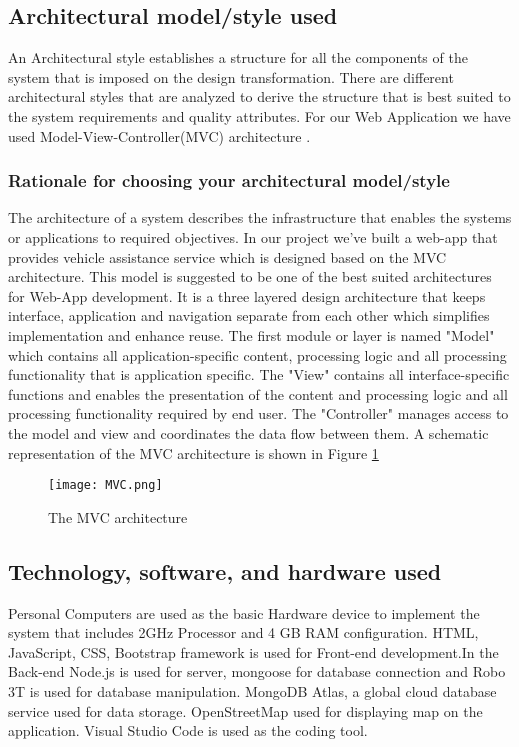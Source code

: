 \documentclass[11pt]{article} %
\begin{document}
	\subsection{Architectural model/style used}
	An Architectural style establishes a structure for all the components of the system that is imposed on the design transformation. There are different architectural styles that are analyzed to derive the structure that is best suited to the system requirements and quality attributes.
	For our Web Application we have used Model-View-Controller(MVC) architecture \cite{archi}.
	
		\subsubsection{Rationale for choosing your architectural model/style}
		The architecture of a system describes the infrastructure that enables the systems or applications to required objectives. In our project we've built a web-app that provides vehicle assistance service which is designed based on the MVC architecture. This model is suggested to be one of the best suited architectures for Web-App development. It is a three layered design architecture that keeps interface, application and navigation separate from each other which simplifies implementation and enhance reuse. The first module or layer is named "Model" which contains all application-specific content, processing logic and all processing functionality that is application specific. The "View" contains all interface-specific functions and enables the presentation of the
		content and processing logic and all processing functionality required by end user. The "Controller" manages access to the model and view and coordinates the data flow between them. A schematic representation of the MVC architecture is shown in Figure \ref{fig:MVC}
		\begin{figure}[!hbt]
		\centering
        \texttt{[image: MVC.png]} \par
        \caption{The MVC architecture}
        \label{fig:MVC}
    \end{figure}
		
		
	
	\subsection{Technology, software, and hardware used}	
	Personal Computers are used as the basic Hardware device to implement the system that includes 2GHz Processor and 4 GB RAM configuration.
	HTML, JavaScript, CSS, Bootstrap framework is used for Front-end development.In the Back-end Node.js is used for server, mongoose for database connection and Robo 3T is used for database manipulation. MongoDB Atlas, a global cloud database service used for data storage. OpenStreetMap used for displaying map on the application. Visual Studio Code is used as the coding tool.
\end{document}
